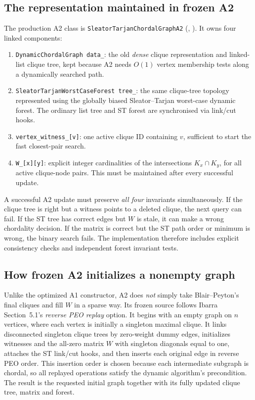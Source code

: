 \subsection{The representation maintained in frozen A2}
The production A2 class is \texttt{SleatorTarjanChordalGraphA2} (, ).  It owns four linked components:
\begin{enumerate}[leftmargin=*]
\item \texttt{DynamicChordalGraph data\_}: the old \emph{dense} clique representation and linked-list clique tree, kept because A2 needs \(O(1)\) vertex membership tests along a dynamically searched path.
\item \texttt{SleatorTarjanWorstCaseForest tree\_}: the same clique-tree topology represented using the globally biased Sleator--Tarjan worst-case dynamic forest.  The ordinary list tree and ST forest are synchronised via link/cut hooks.
\item \texttt{vertex\_witness\_[v]}: one active clique ID containing \(v\), sufficient to start the fast closest-pair search.
\item \texttt{W\_[x][y]}: explicit integer cardinalities of the intersections \(K_x\cap K_y\), for all active clique-node pairs.  This must be maintained after every successful update.
\end{enumerate}
A successful A2 update must preserve \emph{all four} invariants simultaneously.  If the clique tree is right but a witness points to a deleted clique, the next query can fail.  If the ST tree has correct edges but \(W\) is stale, it can make a wrong chordality decision.  If the matrix is correct but the ST path order or minimum is wrong, the binary search fails.  The implementation therefore includes explicit consistency checks and independent forest invariant tests.

\subsection{How frozen A2 initializes a nonempty graph}
Unlike the optimized A1 constructor, A2 does \emph{not} simply take Blair--Peyton's final cliques and fill \(W\) in a sparse way.  Its frozen source follows Ibarra Section~5.1's \emph{reverse PEO replay} option.  It begins with an empty graph on \(n\) vertices, where each vertex is initially a singleton maximal clique.  It links disconnected singleton clique trees by zero-weight dummy edges, initializes witnesses and the all-zero matrix \(W\) with singleton diagonals equal to one, attaches the ST link/cut hooks, and then inserts each original edge in reverse PEO order.  This insertion order is chosen because each intermediate subgraph is chordal, so all replayed operations satisfy the dynamic algorithm's precondition.  The result is the requested initial graph together with its fully updated clique tree, matrix and forest.

